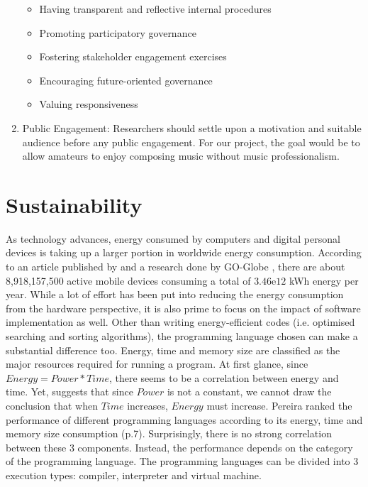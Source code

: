 \begin{enumerate}
    \begin{itemize}
        \item Having transparent and reflective internal procedures
        \item Promoting participatory governance
        \item Fostering stakeholder engagement exercises
        \item Encouraging future-oriented governance
        \item Valuing responsiveness
    \end{itemize}
    \item Public Engagement: Researchers should settle upon a motivation and suitable audience before any public engagement. For our project, the goal would be to allow amateurs to enjoy composing music without
    music professionalism.
\end{enumerate}
\section{Sustainability}
\label{Sustainability}
As technology advances, energy consumed by computers and digital personal devices is taking up a larger portion in worldwide energy consumption. 
According to an article published by \cite{energypy} and a research done by GO-Globe , there are about 8,918,157,500 active
mobile devices consuming a total of $3.46\mathrm{e}{12}$ kWh energy per year.
While a lot of effort has been put into reducing the energy consumption from the hardware perspective,
it is also prime to focus on the impact of software implementation as well.
Other than writing energy-efficient codes (i.e. optimised searching and sorting algorithms), the programming language 
chosen can make a substantial difference too. Energy, time and memory size are classified as the major resources required for running a program.
At first glance, since \(Energy = Power * Time\), there seems to be a correlation between energy and time. Yet,
\cite{energyplanguage} suggests that since \(Power\) is not a constant, we cannot draw the conclusion that
when \(Time\) increases, \(Energy\) must increase. 
Pereira ranked the performance of different programming languages according to its energy, time and memory size consumption (p.7). 
Surprisingly, there is no strong correlation between these 3 components. 
Instead, the performance depends on the category of the programming language.
The programming languages can be divided into 3 execution types: compiler, interpreter and virtual machine.

